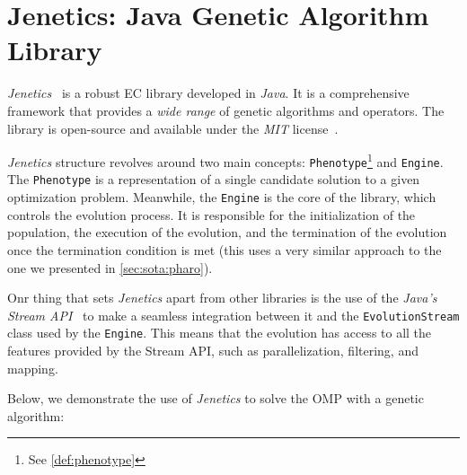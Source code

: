 \section{Jenetics: Java Genetic Algorithm Library}
\label{sec:sota:\textit{jenetics}}

  \emph{Jenetics}~\autocite{wilhelmstotterJeneticsJavaGenetica} is a robust
  EC library developed in \textit{Java}.
  It is a comprehensive framework that provides a \textit{wide range} of genetic
  algorithms and operators.
  The library is open-source and available under the \textit{MIT} 
  license~\autocite{MITLicense2006}.

  \textit{Jenetics} structure revolves around two main concepts: 
  \texttt{Phenotype}\footnote{See \vref{def:phenotype}} and \texttt{Engine}.
  The \texttt{Phenotype} is a representation of a single candidate solution to
  a given optimization problem.
  Meanwhile, the \texttt{Engine} is the core of the library, which controls the
  evolution process.
  It is responsible for the initialization of the population, the execution of
  the evolution, and the termination of the evolution once the termination
  condition is met (this uses a very similar approach to the one we presented 
  in \vref{sec:sota:pharo}).

  Onr thing that sets \textit{Jenetics} apart from other libraries is the use 
  of the \textit{Java's Stream API}~\autocite{StreamJavaPlatform} to make a 
  seamless integration between it and the \texttt{EvolutionStream} class used 
  by the \texttt{Engine}.
  This means that the evolution has access to all the features provided by the
  Stream API, such as parallelization, filtering, and mapping.

  Below, we demonstrate the use of \textit{Jenetics} to solve the OMP with a 
  genetic algorithm:


